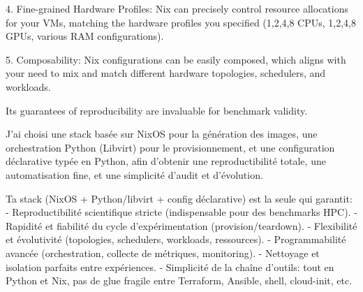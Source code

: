 4. Fine-grained Hardware Profiles: Nix can precisely control resource allocations for your VMs, matching the hardware profiles you specified (1,2,4,8 CPUs, 1,2,4,8 GPUs, various RAM configurations).

5. Composability: Nix configurations can be easily composed, which aligns with your need to mix and match different hardware topologies, schedulers, and workloads.

Its guarantees of reproducibility are invaluable for benchmark validity.

J'ai choisi une stack basée sur NixOS pour la génération des images, une orchestration Python (Libvirt) pour le provisionnement, et une configuration déclarative typée en Python, afin d'obtenir une reproductibilité totale, une automatisation fine, et une simplicité d'audit et d'évolution.

Ta stack (NixOS + Python/libvirt + config déclarative) est la seule qui garantit:
- Reproductibilité scientifique stricte (indispensable pour des benchmarks HPC).
- Rapidité et fiabilité du cycle d'expérimentation (provision/teardown).
- Flexibilité et évolutivité (topologies, schedulers, workloads, ressources).
- Programmabilité avancée (orchestration, collecte de métriques, monitoring).
- Nettoyage et isolation parfaits entre expériences.
- Simplicité de la chaîne d'outils: tout en Python et Nix, pas de glue fragile entre Terraform, Ansible, shell, cloud-init, etc.




